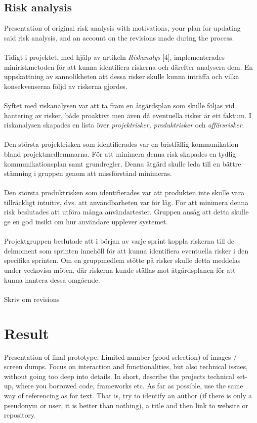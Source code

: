 \documentclass[12pt]{article}
\begin{document}
\subsection{Risk analysis}
Presentation of original risk analysis with motivations, your plan for updating said risk analysis, and an account on the revisions made during the process. \\\\
 Tidigt i projektet, med hjälp av artikeln \textit{Riskanalys} [4], implementerades miniriskmetoden för att kunna identifiera riskerna och därefter analysera dem. En uppskattning av sannolikheten att dessa risker skulle kunna inträffa och vilka konsekvenserna följd av riskerna gjordes.\\\\
 Syftet med riskanalysen var att ta fram en åtgärdsplan som skulle följas vid hantering av risker, både proaktivt men även då eventuella risker är ett faktum. I riskanalysen skapades en lista över \textit{projektrisker, produktrisker} och \textit{affärsrisker}.\\\\
 Den största projektrisken som identifierades var en bristfällig kommunikation bland projektmedlemmarna. För att minimera denna risk skapades en tydlig kommunikationsplan samt grundregler. Denna åtgärd skulle leda till en bättre stämning i gruppen genom att missförstånd minimeras.\\\\
 Den största produktrisken som identifierades var att produkten inte skulle vara tillräckligt intuitiv, dvs. att användbarheten var för låg. För att minimera denna risk beslutades att utföra många användartester. Gruppen ansåg att detta skulle ge en god insikt om hur användare upplever systemet.\\\\
 Projektgruppen beslutade att i början av varje sprint koppla riskerna till de delmoment som sprinten innehöll för att kunna identifiera eventuella risker i den specifika sprinten. Om en gruppmedlem stötte på risker skulle detta meddelas under veckovisa möten, där riskerna kunde ställas mot åtgärdsplanen för att kunna hantera dessa omgående.\\\\
 





Skriv om revisions





\section{Result}
Presentation of final prototype. Limited number (good selection) of images / screen dumps. Focus on interaction and functionalities, but also technical issues, without going too deep into details. In short, describe the projects technical set-up, where you borrowed code, frameworks etc. As far as possible, use the same way of referencing as for text. That is, try to identify an author (if there is only a pseudonym or user, it is better than nothing), a title and then link to website or repository.
\end{document}
